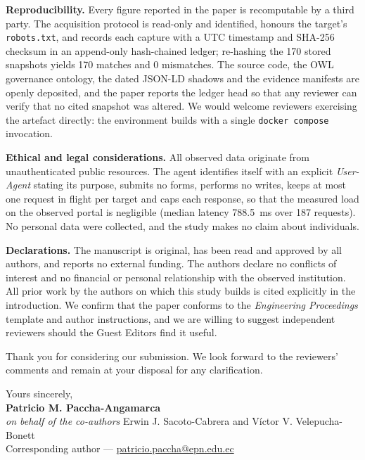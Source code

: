 \documentclass[11pt,a4paper]{article}
\begin{document}
\vspace{4pt}
\textbf{Reproducibility.}
Every figure reported in the paper is recomputable by a third party. The acquisition protocol is read-only and identified, honours the target's \texttt{robots.txt}, and records each capture with a UTC timestamp and SHA-256 checksum in an append-only hash-chained ledger; re-hashing the 170 stored snapshots yields 170 matches and 0 mismatches. The source code, the OWL governance ontology, the dated JSON-LD shadows and the evidence manifests are openly deposited, and the paper reports the ledger head so that any reviewer can verify that no cited snapshot was altered. We would welcome reviewers exercising the artefact directly: the environment builds with a single \texttt{docker compose} invocation.

\vspace{4pt}
\textbf{Ethical and legal considerations.}
All observed data originate from unauthenticated public resources. The agent identifies itself with an explicit \emph{User-Agent} stating its purpose, submits no forms, performs no writes, keeps at most one request in flight per target and caps each response, so that the measured load on the observed portal is negligible (median latency 788.5~ms over 187 requests). No personal data were collected, and the study makes no claim about individuals.

\vspace{4pt}
\textbf{Declarations.}
The manuscript is original, has been read and approved by all authors, and reports no external funding. The authors declare no conflicts of interest and no financial or personal relationship with the observed institution. All prior work by the authors on which this study builds is cited explicitly in the introduction. We confirm that the paper conforms to the \emph{Engineering Proceedings} template and author instructions, and we are willing to suggest independent reviewers should the Guest Editors find it useful.

\vspace{4pt}
Thank you for considering our submission. We look forward to the reviewers' comments and remain at your disposal for any clarification.

\vspace{14pt}

{\raggedright
Yours sincerely,\\[22pt]
\textbf{Patricio M. Paccha-Angamarca}\\
\emph{on behalf of the co-authors} Erwin J. Sacoto-Cabrera and Víctor V. Velepucha-Bonett\\
Corresponding author --- \href{mailto:patricio.paccha@epn.edu.ec}{patricio.paccha@epn.edu.ec}\par}
\end{document}
